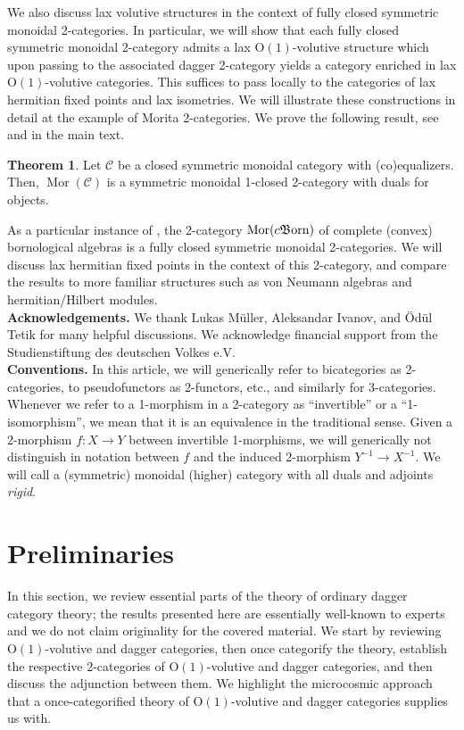 \documentclass{article}
\newcommand{\Mor}{\operatorname{Mor}}%
\newcommand{\cBorn}{c\mathfrak{B}\hspace{-0.05cm}\operatorname{orn}}%
\newcommand{\Oone}{\operatorname{O(1)}}
\newcommand{\C}{\mathcal{C}}
\numberwithin{equation}{section}
\theoremstyle{definition}
\theoremstyle{theorem}
\newtheorem{Itheorem}{Theorem}
\begin{document}
We also discuss lax volutive structures in the context of fully closed symmetric monoidal 2-categories. In particular, we will show that each fully closed 
symmetric monoidal 2-category admits a lax $\Oone$-volutive structure which upon passing to the associated dagger 2-category yields a category enriched in 
lax $\Oone$-volutive categories. This suffices to pass locally to the categories of lax hermitian fixed points and lax isometries.
We will illustrate these constructions in detail at the example of Morita 2-categories. We prove the following result, see 
 and  in the main text. 
\begin{Itheorem}\label{Theorem: Morita 2-categories are closed}
    Let $\C$ be a closed symmetric monoidal category with (co)equalizers. Then, $\Mor(\C)$ is a symmetric monoidal 1-closed 2-category with duals for objects.
\end{Itheorem}
As a particular instance of , the 2-category $\Mor(\cBorn)$ of complete (convex) bornological algebras is a fully 
closed symmetric monoidal 2-categories. We will discuss lax hermitian fixed points in the context of this 2-category, and compare the results to more familiar 
structures such as von Neumann algebras and hermitian/Hilbert modules.\\

\textbf{Acknowledgements.} We thank Lukas Müller, Aleksandar Ivanov, and Ödül Tetik for many helpful discussions. We acknowledge financial support from the 
Studienstiftung des deutschen Volkes e.V.\\

\textbf{Conventions.} In this article, we will generically refer to bicategories as 2-categories, to pseudofunctors as 2-functors, etc., and similarly for 3-categories. 
Whenever we refer to a 1-morphism in a 2-category as ``invertible'' or a ``1-isomorphism'', we mean that it is an equivalence in the traditional sense. Given a 
2-morphism $f \colon X \to Y$ between invertible 1-morphisms, we will generically not distinguish in notation between $f$ and the induced 2-morphism $Y^{-1} \to X^{-1}$.
We will call a (symmetric) monoidal (higher) category with all duals and adjoints \emph{rigid}.

\section{Preliminaries}\label{Section: Preliminaries}
In this section, we review essential parts of the theory of ordinary dagger category theory; the results presented here are essentially well-known to experts and 
we do not claim originality for the covered material. We start by reviewing $\Oone$-volutive and dagger categories, then once categorify the theory, 
establish the respective 2-categories of $\Oone$-volutive and dagger categories, and then discuss the adjunction between them. We highlight the microcosmic 
approach that a once-categorified theory of $\Oone$-volutive and dagger categories supplies us with. 
\end{document}
